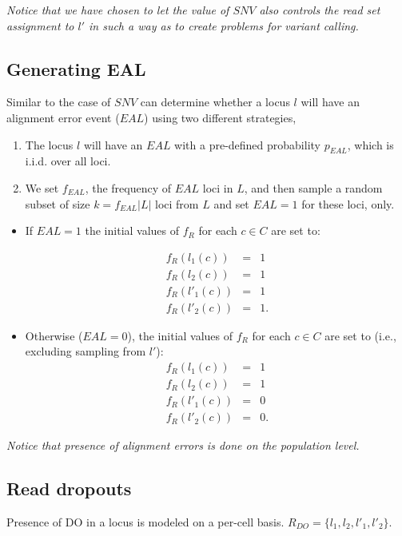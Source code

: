 \documentclass[a4paper,11pt]{article}
\begin{document}
\emph{Notice that we have chosen to let the value of $SNV$ also
  controls the read set assignment to $l'$ in such a way as to create
  problems for variant calling.}

\subsection{Generating EAL}
\label{sec:alignment-error}

Similar to the case of $SNV$ can determine whether a locus $l$ will
have an alignment error event ($EAL$) using two different strategies,
\begin{enumerate}
\item The locus $l$ will have an $EAL$ with a pre-defined probability
  $p_{EAL}$, which is i.i.d. over all loci.
\item We set $f_{EAL}$, the frequency of $EAL$ loci in $L$, and then
  sample a random subset of size  $k=f_{EAL}|L|$ loci from $L$ and set $EAL=1$
  for these loci, only.
\end{enumerate}

\begin{itemize}
\item If $EAL=1$ the initial values of $f_R$ for each $c\in C$ are set
  to:

\begin{eqnarray}
  f_R(l_1(c)) &=& 1\\
  f_R(l_2(c)) &=& 1\\
  f_R(l'_1(c)) &=& 1\\
  f_R(l'_2(c)) &=& 1.
\end{eqnarray}
\item Otherwise ($EAL=0$), the initial values of $f_R$ for each $c\in C$ are
set to (i.e., excluding sampling from $l'$):
\begin{eqnarray}
  f_R(l_1(c)) &=& 1\\
  f_R(l_2(c)) &=& 1\\
  f_R(l'_1(c)) &=& 0\\
  f_R(l'_2(c)) &=& 0.
\end{eqnarray}
\end{itemize}
\emph{Notice that presence of alignment errors is done on the \emph{population level}.}

\subsection{Read dropouts}
\label{sec:allelic-dropout}

Presence of DO in a locus is modeled on a per-cell basis.
$R_{DO} = \{l_1,l_2, l'_1, l'_2\}$. 
\end{document}
